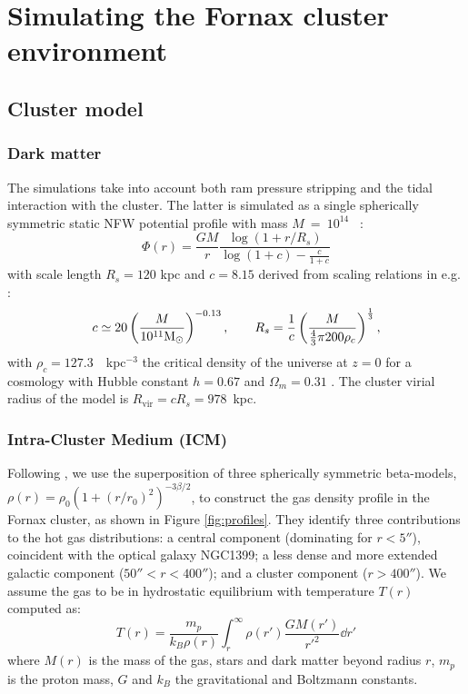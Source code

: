 \section{Simulating the Fornax cluster environment}
\label{sec:fornax_sim}

\subsection{Cluster model}

\subsubsection{Dark matter}
The simulations take into account both ram pressure stripping and the tidal interaction with the cluster.
The latter is simulated as a single spherically symmetric static NFW potential profile \citep{Navarro1996} with mass $M~=~10^{14}$~\Msun{} \citep{Drinkwater2001a}:
\begin{equation}
    \Phi(r) = \frac{G M}{r} \frac{\log(1+r/R_s)}{\log(1 + c) - \frac{c}{1+c}}
\end{equation}
with scale length $R_s = 120$ kpc and $c=8.15$ derived from scaling relations in e.g. \citet{Gentile2004, Wechsler2002}:
\begin{equation}
    c \simeq 20 \left(\frac{M}{10^{11} \text{\text{M}$_{\odot}${}} }\right)^{-0.13}, \qquad
    R_s = \frac 1 c \left(\frac{M}{\frac 4 3 \pi 200 \rho_c}\right)^\frac 1 3,
\end{equation}
with $\rho_c = 127.3$~\Msun{}~kpc$^{-3}$ the critical density of the universe at $z=0$ for a cosmology with Hubble constant $h=0.67$ and $\Omega_m = 0.31$ \citep{Planck2015}.
The cluster virial radius of the model is $R_{\mathrm{vir}} = c R_s = 978$~kpc.

\subsubsection{Intra-Cluster Medium (ICM)} \label{sec:ICM}
Following \citet{Paolillo2002}, we use the superposition of three spherically symmetric beta-models, $\rho(r) = \rho_0 (1 + (r/r_0)^2 )^{-3\beta/2}$, to construct the gas density profile in the Fornax cluster, as shown in Figure \ref{fig:profiles}.
They identify three contributions to the hot gas distributions: a central component (dominating for $r<5''$), coincident with the optical galaxy NGC1399; a less dense and more extended galactic component ($50''<r<400''$); and a cluster component ($r>400''$).
We assume the gas to be in hydrostatic equilibrium with temperature $T(r)$ computed as:
\begin{equation}
   T(r) = \frac {m_p}{k_B \rho(r)} \int_r^\infty \rho(r') \frac{GM(r')}{r'^2} \dd{r'}
\end{equation}
where $M(r)$ is the mass of the gas, stars and dark matter beyond radius $r$, $m_p$ is the proton mass, $G$ and $k_B$ the gravitational and Boltzmann constants.

